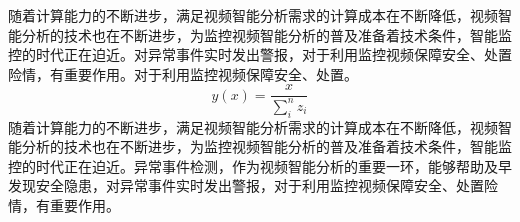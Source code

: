   随着计算能力的不断进步，满足视频智能分析需求的计算成本在不断降低，视频智能分析的技术也在不断进步，为监控视频智能分析的普及准备着技术条件，智能监控的时代正在迫近。对异常事件实时发出警报，对于利用监控视频保障安全、处置险情，有重要作用。对于利用监控视频保障安全、处置。
  \begin{equation}\label{eq:eg:atbottom}
  y(x)=\frac{x}{\sum_i^{n}z_i}
  \end{equation}
  随着计算能力的不断进步，满足视频智能分析需求的计算成本在不断降低，视频智能分析的技术也在不断进步，为监控视频智能分析的普及准备着技术条件，智能监控的时代正在迫近。异常事件检测，作为视频智能分析的重要一环，能够帮助及早发现安全隐患，对异常事件实时发出警报，对于利用监控视频保障安全、处置险情，有重要作用。

